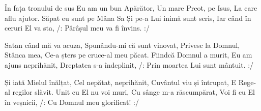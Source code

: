 \beginverse
În fața tronului de sus
Eu am un bun Apărător,
Un mare Preot, pe Isus,
La care aflu ajutor.
Săpat eu sunt pe Mâna Sa
Și pe-a Lui inimă sunt scris,
Iar când în ceruri El va sta,
/: Pârâșul meu va fi învins. :/
\endverse

\beginverse
Satan când mă va acuza,
Spunându-mi că sunt vinovat,
Privesc la Domnul, Stânca mea,
Ce-a șters pe cruce-al meu păcat.
Fiindcă Domnul a murit,
Eu am ajuns neprihănit,
Dreptatea s-a îndeplinit,
/: Prin moartea Lui sunt mântuit. :/
\endverse

\beginverse
Și iată Mielul înălțat,
Cel nepătat, neprihănit,
Cuvântul viu și întrupat,
E Rege-al regilor slăvit.
Unit cu El nu voi muri,
Cu sânge m-a răscumpărat,
Voi fi cu El în veșnicii,
/: Cu Domnul meu glorificat! :/
\endverse
\endsong
